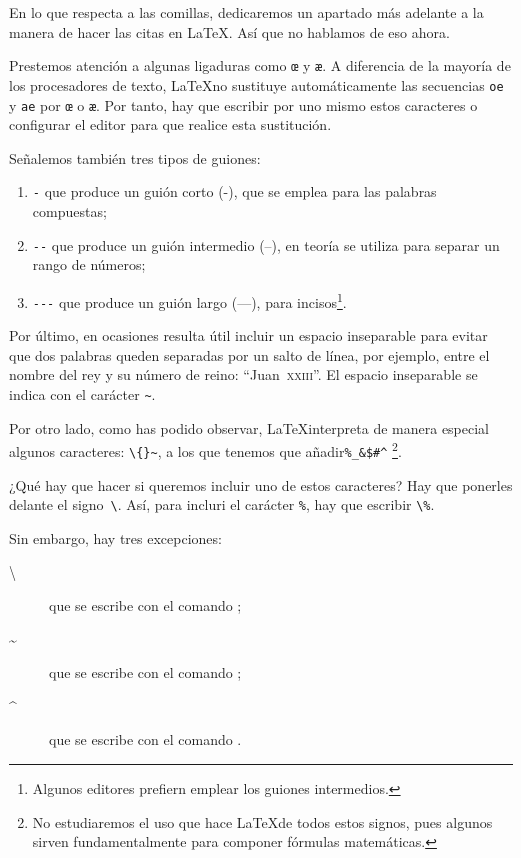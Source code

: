 En lo que respecta a las comillas, dedicaremos un apartado más adelante a la manera de hacer las citas en \LaTeX. Así que no hablamos de eso ahora.

Prestemos atención a algunas ligaduras como \verb|œ| y  \verb|æ|. A diferencia de la mayoría de los procesadores de texto, \LaTeX no sustituye automáticamente las secuencias \verb|oe| y \verb|ae| por \verb|œ| o \verb|æ|. Por tanto, hay que escribir por uno mismo estos caracteres o configurar el editor para que realice esta sustitución.

Señalemos también tres tipos de guiones\label{tirets}:
\begin{enumerate}
\item \verb|-| que produce un guión corto (-), que se emplea para las palabras compuestas;
\item \verb|--| que produce un guión intermedio (--), en teoría se utiliza para separar un rango de números;
\item \verb|---| que produce un guión largo (---), para incisos\footnote{Algunos editores prefiern emplear los guiones intermedios.}.
\end{enumerate}
 
 Por último, en ocasiones resulta útil incluir un espacio inseparable para evitar que dos palabras queden separadas por un salto de línea, por ejemplo, entre el nombre del rey y su número de reino: \enquote{Juan~\textsc{xxiii}}.  El espacio inseparable se indica con el carácter \verb|~|.

Por otro lado, como has podido observar, \LaTeX interpreta de manera especial algunos caracteres: \verb|\{}~|, a los que tenemos que añadir\verb|%_&$#^| \footnote{No estudiaremos el uso que hace \LaTeX de todos estos signos, pues algunos sirven fundamentalmente para componer fórmulas matemáticas.}.

¿Qué hay que hacer si queremos incluir uno de estos caracteres? Hay que ponerles delante el signo~\verb|\|. Así, para incluri el carácter \verb|%|, hay que escribir \verb|\%|. 

Sin embargo, hay tres excepciones:
\begin{description}
\item[\textbackslash] que se escribe con el comando  ;
\item[\textasciitilde] que se escribe con el comando  ; 
\item[\textasciicircum] que se escribe con el comando . 
\end{description} 
